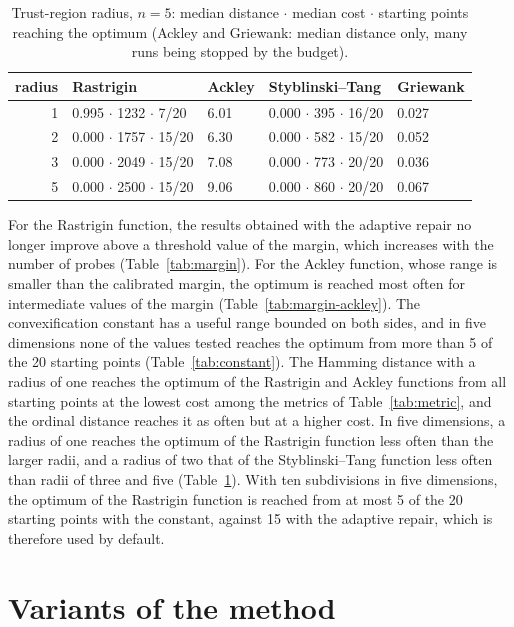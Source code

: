 \documentclass[pdflatex,sn-basic]{sn-jnl}
\newenvironment{appendices}{\appendix}{}
\begin{document}
\begin{appendices}
\begin{table}[h]
  \centering
  \caption{Trust-region radius, $n = 5$: median distance $\cdot$ median cost
    $\cdot$ starting points reaching the optimum (Ackley and Griewank: median
    distance only, many runs being stopped by the budget).}
  \label{tab:radius}
  \small
  \begin{tabular}{rllll}
    \toprule
    radius & Rastrigin & Ackley & Styblinski--Tang & Griewank \\
    \midrule
    1 & 0.995 $\cdot$ 1232 $\cdot$ 7/20  & 6.01 & 0.000 $\cdot$ 395 $\cdot$ 16/20 & 0.027 \\
    2 & 0.000 $\cdot$ 1757 $\cdot$ 15/20 & 6.30 & 0.000 $\cdot$ 582 $\cdot$ 15/20 & 0.052 \\
    3 & 0.000 $\cdot$ 2049 $\cdot$ 15/20 & 7.08 & 0.000 $\cdot$ 773 $\cdot$ 20/20 & 0.036 \\
    5 & 0.000 $\cdot$ 2500 $\cdot$ 15/20 & 9.06 & 0.000 $\cdot$ 860 $\cdot$ 20/20 & 0.067 \\
    \bottomrule
  \end{tabular}
\end{table}

For the Rastrigin function, the results obtained with the adaptive repair no
longer improve above a threshold value of the margin, which increases with the
number of probes (Table~\ref{tab:margin}). For the Ackley function, whose range
is smaller than the calibrated margin, the optimum is reached most often for
intermediate values of the margin (Table~\ref{tab:margin-ackley}). The
convexification constant has a useful range bounded on both sides, and in five
dimensions none of the values tested reaches the optimum from more than 5 of the
20 starting points (Table~\ref{tab:constant}). The Hamming distance
with a radius of one reaches the optimum of the Rastrigin and Ackley functions
from all starting points at the lowest cost among the metrics of
Table~\ref{tab:metric}, and the ordinal distance reaches it as often but at a
higher cost. In five dimensions, a radius of one reaches the optimum of the
Rastrigin function less often than the larger radii, and a radius of two that of
the Styblinski--Tang function less often than radii of three and five
(Table~\ref{tab:radius}). With ten subdivisions in five dimensions, the optimum
of the Rastrigin function is reached from at most 5 of the 20 starting points
with the constant, against 15 with the adaptive repair, which is therefore used by
default.

\section{Variants of the method}\label{app:variants}


\end{appendices}
\end{document}
